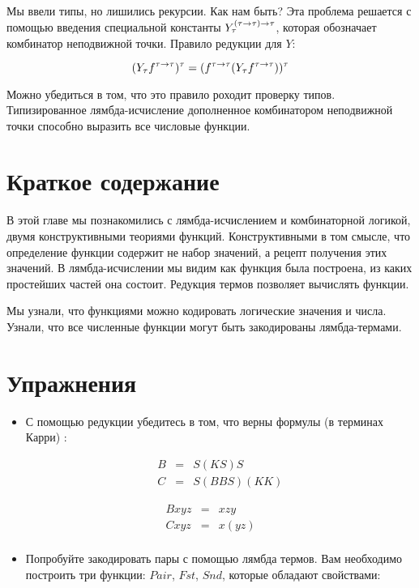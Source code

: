 Мы ввели типы, но лишились рекурсии. Как нам быть? Эта проблема решается
с помощью введения специальной константы
$Y_\tau^{(\tau \rightarrow \tau) \rightarrow \tau}$, которая обозначает комбинатор
неподвижной точки. Правило редукции для $Y$:

\[(Y_\tau f^{\tau \rightarrow \tau})^\tau = 
    (f^{\tau \rightarrow \tau}(Y_\tau f^{\tau \rightarrow \tau}))^\tau\]

Можно убедиться в том, что это правило роходит проверку типов.
Типизированное лямбда-исчисление дополненное комбинатором неподвижной
точки способно выразить все числовые функции.

\section{Краткое содержание}

В этой главе мы познакомились с лямбда-исчислением и комбинаторной
логикой, двумя конструктивными теориями функций. Конструктивными в том
смысле, что определение функции содержит не набор значений, а рецепт
получения этих значений. В лямбда-исчислении мы видим как функция была
построена, из каких простейших частей она состоит. Редукция термов
позволяет вычислять функции.

Мы узнали, что функциями можно кодировать логические значения и числа.
Узнали, что все численные функции могут быть закодированы
лямбда-термами.

\section{Упражнения}

\begin{itemize}
\item
  С помощью редукции убедитесь в том, что верны формулы (в терминах
  Карри) :

  \begin{eqnarray*}
  B &=& S(KS)S \\
  C &=& S(BBS)(KK)
  \end{eqnarray*}
\end{itemize}

\begin{eqnarray*}
Bxyz &=& xzy \\
Cxyz &=& x(yz) \\
\end{eqnarray*}

\begin{itemize}
\item
  Попробуйте закодировать пары с помощью лямбда термов. Вам необходимо
  построить три функции: $Pair$, $Fst$, $Snd$, которые обладают
  свойствами:
\end{itemize}

